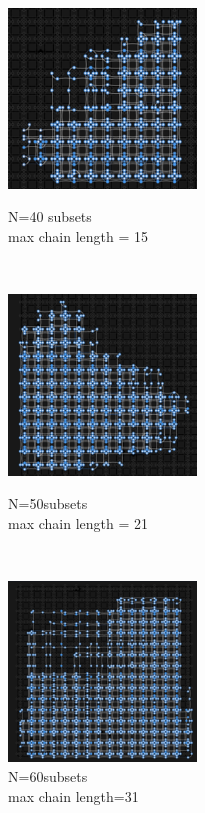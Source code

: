 \documentclass[oneside,a4paper]{article}
\begin{document}
\begin{figure}[htp]
\begin{minipage}[b]{4.5cm}
\centering
\includegraphics[width=5cm]{LaTeXTemplate/Images/2000Qfirst40.png}
\caption{N=40 subsets\\max chain length = 15}
\end{minipage}
\ \hspace{2mm} \hspace{2mm} \
\begin{minipage}[b]{4.5cm}
\centering
\includegraphics[width=5cm]{LaTeXTemplate/Images/2000Qfirst50.png}
\caption{N=50subsets\\max chain length = 21}
\end{minipage}
\ \hspace{2mm} \hspace{2mm} \
\begin{minipage}[b]{4.5cm}
\centering
\includegraphics[width=5cm]{LaTeXTemplate/Images/2000Qfirst60.png}
\caption{N=60subsets\\max chain length=31}
\end{minipage}
\end{figure}
\end{document}

